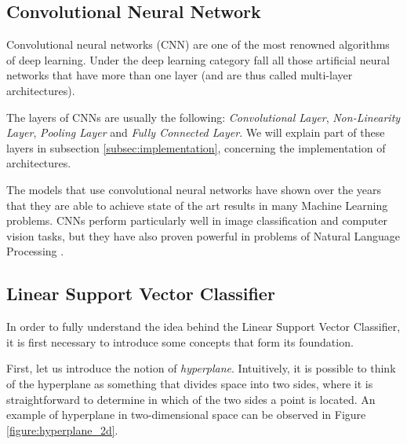 \documentclass[letterpaper,11pt]{article}
\begin{document}
\subsection{Convolutional Neural Network}

Convolutional neural networks (CNN) are one of the most renowned algorithms of deep learning. Under the deep learning category fall all those artificial neural networks that have more than one layer (and are thus called multi-layer architectures).

The layers of CNNs are usually the following: \textit{Convolutional Layer}, \textit{Non-Linearity Layer}, \textit{Pooling Layer} and \textit{Fully Connected Layer}. We will explain part of these layers in subsection \ref{subsec:implementation}, concerning the implementation of architectures.

The models that use convolutional neural networks have shown over the years that they are able to achieve state of the art results in many Machine Learning problems. CNNs perform particularly well in image classification and computer vision tasks, but they have also proven powerful in problems of Natural Language Processing \cite{Albawi2017UnderstandingOA}.

\subsection{Linear Support Vector Classifier}

In order to fully understand the idea behind the Linear Support Vector Classifier, it is first necessary to introduce some concepts that form its foundation.

First, let us introduce the notion of \textit{hyperplane}. Intuitively, it is possible to think of the hyperplane as something that divides space into two sides, where it is straightforward to determine in which of the two sides a point is located. An example of hyperplane in two-dimensional space can be observed in Figure \ref{figure:hyperplane_2d}.
\end{document}
